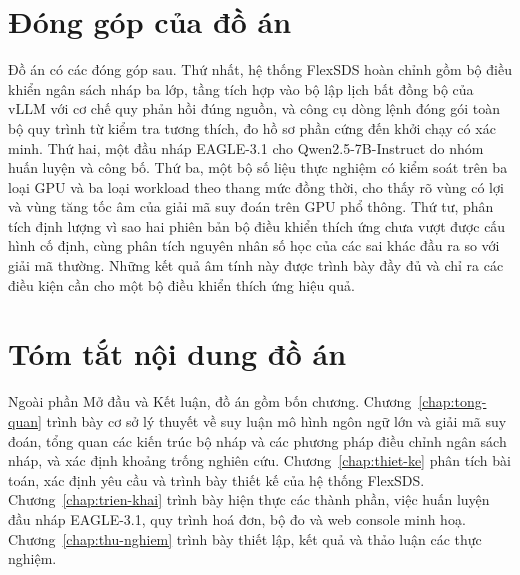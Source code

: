 \section*{Đóng góp của đồ án}

Đồ án có các đóng góp sau. Thứ nhất, hệ thống FlexSDS hoàn chỉnh gồm bộ điều khiển ngân sách nháp ba lớp, tầng tích hợp vào bộ lập lịch bất đồng bộ của vLLM với cơ chế quy phản hồi đúng nguồn, và công cụ dòng lệnh đóng gói toàn bộ quy trình từ kiểm tra tương thích, đo hồ sơ phần cứng đến khởi chạy có xác minh. Thứ hai, một đầu nháp EAGLE-3.1 cho Qwen2.5-7B-Instruct do nhóm huấn luyện và công bố. Thứ ba, một bộ số liệu thực nghiệm có kiểm soát trên ba loại GPU và ba loại workload theo thang mức đồng thời, cho thấy rõ vùng có lợi và vùng tăng tốc âm của giải mã suy đoán trên GPU phổ thông. Thứ tư, phân tích định lượng vì sao hai phiên bản bộ điều khiển thích ứng chưa vượt được cấu hình cố định, cùng phân tích nguyên nhân số học của các sai khác đầu ra so với giải mã thường. Những kết quả âm tính này được trình bày đầy đủ và chỉ ra các điều kiện cần cho một bộ điều khiển thích ứng hiệu quả.

\section*{Tóm tắt nội dung đồ án}

Ngoài phần Mở đầu và Kết luận, đồ án gồm bốn chương. Chương~\ref{chap:tong-quan} trình bày cơ sở lý thuyết về suy luận mô hình ngôn ngữ lớn và giải mã suy đoán, tổng quan các kiến trúc bộ nháp và các phương pháp điều chỉnh ngân sách nháp, và xác định khoảng trống nghiên cứu. Chương~\ref{chap:thiet-ke} phân tích bài toán, xác định yêu cầu và trình bày thiết kế của hệ thống FlexSDS. Chương~\ref{chap:trien-khai} trình bày hiện thực các thành phần, việc huấn luyện đầu nháp EAGLE-3.1, quy trình hoá đơn, bộ đo và web console minh hoạ. Chương~\ref{chap:thu-nghiem} trình bày thiết lập, kết quả và thảo luận các thực nghiệm.
